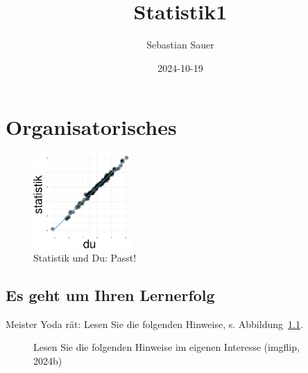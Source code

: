 \documentclass[
  a4paper,
]{scrbook}
\title{Statistik1}
\author{Sebastian Sauer}
\date{2024-10-19}
\renewcommand*\contentsname{Inhaltsverzeichnis}
\newcommand\contentsname{Inhaltsverzeichnis}
\theoremstyle{definition}
\theoremstyle{definition}
\theoremstyle{definition}
\theoremstyle{remark}
\begin{document}
\frontmatter
\maketitle

\renewcommand*\contentsname{Inhaltsverzeichnis}
{
\setcounter{tocdepth}{2}
\tableofcontents
}

\mainmatter
{}

\chapter{Organisatorisches}\label{organisatorisches}

\begin{figure}[H]

{\centering \includegraphics[width=0.33\textwidth,height=\textheight]{index_files/figure-pdf/statistik-und-du-guter-fit-1.pdf}

}

\caption{Statistik und Du: Passt!}

\end{figure}%

\section{Es geht um Ihren Lernerfolg}\label{es-geht-um-ihren-lernerfolg}

Meister Yoda rät: Lesen Sie die folgenden Hinweise, s.
Abbildung~\ref{fig-yoda}.

\begin{figure}


\caption{\label{fig-yoda}Lesen Sie die folgenden Hinweise im eigenen
Interesse (imgflip, 2024b)}

\end{figure}%
\end{document}
